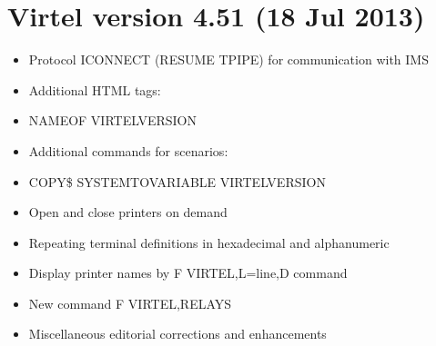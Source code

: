 \documentclass[letterpaper,10pt,english]{sphinxmanual}
\begin{document}
\section{Virtel version 4.51 (18 Jul 2013)}
\label{\detokenize{Installation_Guide:virtel-version-4-51-18-jul-2013}}
\sphinxAtStartPar
{}
\begin{itemize}
\item {} 
\sphinxAtStartPar
Protocol ICONNECT (RESUME TPIPE) for communication with IMS

\end{itemize}

\sphinxAtStartPar
{}
\begin{itemize}
\item {} 
\sphinxAtStartPar
Additional HTML tags:

\item {} 
\sphinxAtStartPar
NAME\sphinxhyphen{}OF VIRTEL\sphinxhyphen{}VERSION

\end{itemize}

\sphinxAtStartPar
{}
\begin{itemize}
\item {} 
\sphinxAtStartPar
Additional commands for scenarios:

\item {} 
\sphinxAtStartPar
COPY\$ SYSTEM\sphinxhyphen{}TO\sphinxhyphen{}VARIABLE VIRTEL\sphinxhyphen{}VERSION

\end{itemize}

\sphinxAtStartPar
{}
\begin{itemize}
\item {} 
\sphinxAtStartPar
Open and close printers on demand

\item {} 
\sphinxAtStartPar
Repeating terminal definitions in hexadecimal and alphanumeric

\item {} 
\sphinxAtStartPar
Display printer names by F VIRTEL,L=line,D command

\item {} 
\sphinxAtStartPar
New command F VIRTEL,RELAYS

\item {} 
\sphinxAtStartPar
Miscellaneous editorial corrections and enhancements

\end{itemize}
\end{document}
